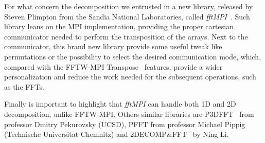 \par
For what concern the decomposition we entrusted in a new library, released by Steven Plimpton from the Sandia National Laboratories, called \emph{fftMPI}~\cite{fftMPI}. Such library leans on the MPI implementation, providing the proper cartesian communicator needed to perform the transposition of the arrays. Next to the communicator, this brand new library provide some useful tweak like permutations or the possibility to select the desired communication mode, which, compared with the FFTW-MPI Transpose~\cite{FFTW05}\cite{FFTW:transpose} features, provide a wider personalization and reduce the work needed for the subsequent operations, such as the FFTs. 
\par
Finally is important to highlight that \emph{fftMPI} can handle both 1D and 2D decomposition, unlike FFTW-MPI.
Others similar libraries are P3DFFT~\cite{p3dfft} from professor Dmitry Pekurovsky (UCSD), PFFT from professor Michael Pippig~\cite{pfft} (Technische Universitat Chemnitz) and 2DECOMP\&FFT~\cite{2decomp} by Ning Li.





